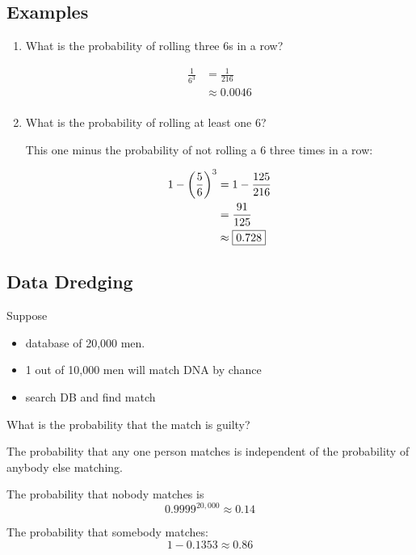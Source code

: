 \documentclass[letterpaper, landscape]{exam}
\begin{document}
  \subsection{Examples}
  \begin{enumerate}
    \item What is the probability of rolling three 6s in a row?
      \begin{solution}
        \begin{align*}
          \frac{1}{6^3} & = \frac{1}{216} \\
                        & \approx \boxed{ 0.0046 } \\
        \end{align*}
      \end{solution}

    \item What is the probability of rolling at least one 6?
      \begin{solution}
        This one minus the probability of not rolling a 6 three times in a row:

        \begin{align*}
          1 - \del{ \frac{5}{6} }^3 & = 1 - \frac{125}{216} \\
                                    & = \frac{91}{125} \\
                                    & \approx \boxed{ 0.728 } \\
        \end{align*}

      \end{solution}

  \end{enumerate}

  \subsection{Data Dredging}
  Suppose 
  \begin{itemize}
    \item database of 20,000 men.
    \item 1 out of 10,000 men will match DNA by chance
    \item search DB and find match
  \end{itemize}

  What is the probability that the match is guilty?

  \begin{solution}
    The probability that any one person matches is independent of the
    probability of anybody else matching.

    The probability that nobody matches is
    \[
      0.9999^{20,000} \approx 0.14
    \]

    The probability that somebody matches:
    \[
      1 - 0.1353 \approx 0.86
    \]
  \end{solution}
\end{document}
